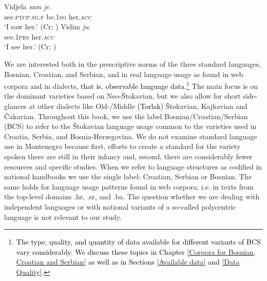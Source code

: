 \begin{exe}\ex\label{(2609)}\begin{xlist}
\ex\label{(2609a)}
\gll Vidjela \textit{sam} \textit{je}. \\
see\textsc{.ptcp.sg.f} be\textsc{.1sg} her\textsc{.acc} \\
\glt `I saw her.'
\hfill (Cr; \citealt[173]{BHMV99})
\ex\label{(2609b)}
\gll Vidim \textit{ju}. \\
see\textsc{.1prs} her\textsc{.acc} \\
\glt `I see her.'
\hfill (Cr; \citealt[74]{HMBO14})
\end{xlist}
\end{exe}

\noindent We are interested both in the prescriptive norms of the three standard languages, Bosnian, Croatian, and Serbian, and in real language usage as found in web corpora and in dialects\textcolor{black}{, that is, observable language data}.\footnote{\textcolor{black}{The type, quality, and quantity of data available for different variants of BCS vary considerably. We discuss these topics in Chapter \ref{Corpora for Bosnian, Croatian and Serbian} \textcolor{black}{as well as} in Sections \ref{Available data} and \ref{Data Quality}}.} The main focus is on the dominant varieties based on Neo-Štokavian, but we also allow for short side-glances at other dialects like Old-/Middle \textcolor{black}{(Torlak)} Štokavian, Kajkavian and Čakavian. Throughout this book, we use the label Bosnian\slash Croatian\slash Serbian (BCS) to refer to the Štokavian language usage common to the varieties used in Croatia, Serbia, and Bosnia-Herzegovina. We do not examine standard language use in Montenegro because first, efforts to create a standard for the variety spoken there are still in their infancy and, second, there are considerably fewer resources and specific studies. When we refer to language structures as codified in national handbooks we use the single label: Croatian, Serbian or Bosnian. The same holds for language usage patterns found in web corpora; i.e. in texts from the top-level domains .hr, .sr, and .ba. The question whether we are dealing with independent languages or with national variants of a so-called polycentric language is not relevant to our study. 

